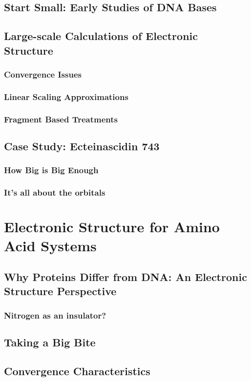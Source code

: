 \documentclass[oneside,12pt]{book}
\begin{document}
\section{Start Small:  Early Studies of DNA Bases}
\section{Large-scale Calculations of Electronic Structure}
\subsection{Convergence Issues}
\subsection{Linear Scaling Approximations}
\subsection{Fragment Based Treatments}
\section{Case Study: Ecteinascidin 743}
\subsection{How Big is Big Enough}
\subsection{It's all about the orbitals}

\chapter{Electronic Structure for Amino Acid Systems}
\section{Why Proteins Differ from DNA: An Electronic Structure Perspective}
\subsection{Nitrogen as an insulator?}
\section{Taking a Big Bite}
\section{Convergence Characteristics}
\end{document}
